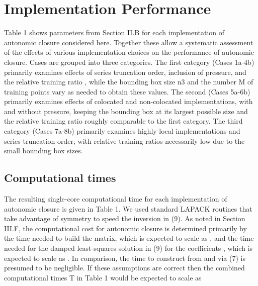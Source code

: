 \graphicspath{ {./Ch5/}  } 

\chapter{Implementation Performance}

Table 1 shows parameters from Section II.B for each implementation of autonomic closure considered here. Together these allow a systematic assessment of the effects of various implementation choices on the performance of autonomic closure. Cases are grouped into three categories. The first category (Cases 1a-4b) primarily examines effects of series truncation order, inclusion of pressure, and the relative training ratio  , while the bounding box size n3 and the number M of training points vary as needed to obtain these   values. The second (Cases 5a-6b) primarily examines effects of colocated and non-colocated implementations, with and without pressure, keeping the bounding box at its largest possible size and the relative training ratio   roughly comparable to the first category. The third category (Cases 7a-8b) primarily examines highly local implementations and series truncation order, with relative training ratios   necessarily low due to the small bounding box sizes. 

\section{Computational times} 

The resulting single-core computational time for each implementation of autonomic closure is given in Table 1. We used standard LAPACK routines that take advantage of symmetry to speed the inversion in (9). As noted in Section III.F, the computational cost for autonomic closure is determined primarily by the time needed to build the   matrix, which is expected to scale as  , and the time needed for the damped least-squares solution in (9) for the coefficients  , which is expected to scale as  . In comparison, the time to construct   from   and   via (7) is presumed to be negligible. If these assumptions are correct then the combined computational times T in Table 1 would be expected to scale as

